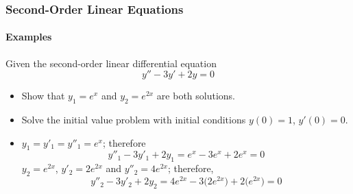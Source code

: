 \documentclass[9pt,xcolor=x11names,compress]{beamer}
\begin{document}
\begin{frame}\frametitle{Second-Order Linear Equations}
\framesubtitle{Examples}
\begin{block}{Given the second-order linear differential equation}
\begin{equation*}
	y''-3y'+2y=0
\end{equation*}
\begin{itemize}
	\item \alert<2>{Show that $y_1=e^x$ and $y_2=e^{2x}$ are both solutions.}
	\item Solve the initial value problem with initial conditions $y(0)=1$, $y'(0)=0$.
\end{itemize}
\end{block}
\begin{itemize}
	\item<2> $y_1=y'_1=y''_1=e^x$; therefore
	\begin{equation*}
		y''_1-3y'_1+2y_1=e^x-3e^x+2e^x=0
	\end{equation*}
	$y_2=e^{2x}$, $y'_2=2e^{2x}$ and $y''_2=4e^{2x}$; therefore,
	\begin{equation*}
		y''_2-3y'_2+2y_2=4e^{2x}-3\big( 2e^{2x} \big)+2\big( e^{2x} \big) = 0
	\end{equation*}
	\end{itemize}
	\end{frame}
\end{document}
